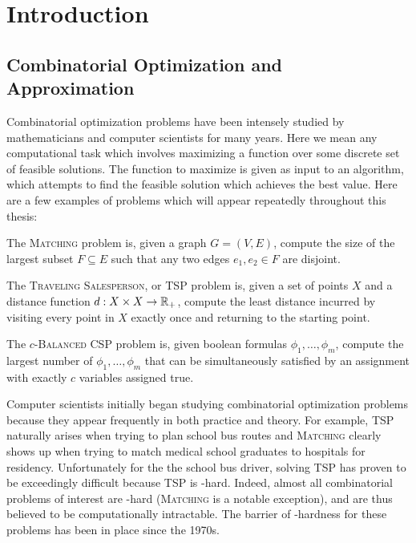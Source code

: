 \chapter{Introduction}\label{cha:introduction}

\section{Combinatorial Optimization and Approximation}
Combinatorial optimization problems have been intensely studied by mathematicians and computer scientists for many years.
Here we mean any computational task which involves maximizing a function over some discrete set of feasible solutions.
The function to maximize is given as input to an algorithm, which attempts to find the feasible solution which achieves the best value. 
Here are a few examples of problems which will appear repeatedly throughout this thesis: 
\begin{example}
The \textsc{Matching} problem is, given a graph $G = (V,E)$, compute the size of the largest subset $F \subseteq E$ such that any two edges $e_1,e_2 \in F$ are disjoint.
\end{example}
\begin{example}
The \textsc{Traveling Salesperson}, or \textsc{TSP} problem is, given a set of points $X$ and a distance function $d: X \times X \rightarrow \mathbb R_+$, compute the least distance incurred by visiting every point in $X$ exactly once and returning to the starting point.
\end{example}
\begin{example}
The \textsc{$c$-Balanced CSP} problem is, given boolean formulas $\phi_1,\dots,\phi_m$, compute the largest number of $\phi_1,\dots,\phi_m$ that can be simultaneously satisfied by an assignment with exactly $c$ variables assigned true.
\end{example}

Computer scientists initially began studying combinatorial optimization problems because they appear frequently in both practice and theory.
For example, \textsc{TSP} naturally arises when trying to plan school bus routes and \textsc{Matching} clearly shows up when trying to match medical school graduates to hospitals for residency. Unfortunately for the the school bus driver, solving \textsc{TSP} has proven to be exceedingly difficult because \textsc{TSP} is \np-hard\cite{Karp1972}. Indeed, almost all combinatorial problems of interest are \np-hard (\textsc{Matching} is a notable exception), and are thus believed to be computationally intractable. The barrier of \np-hardness for these problems has been in place since the 1970s.

